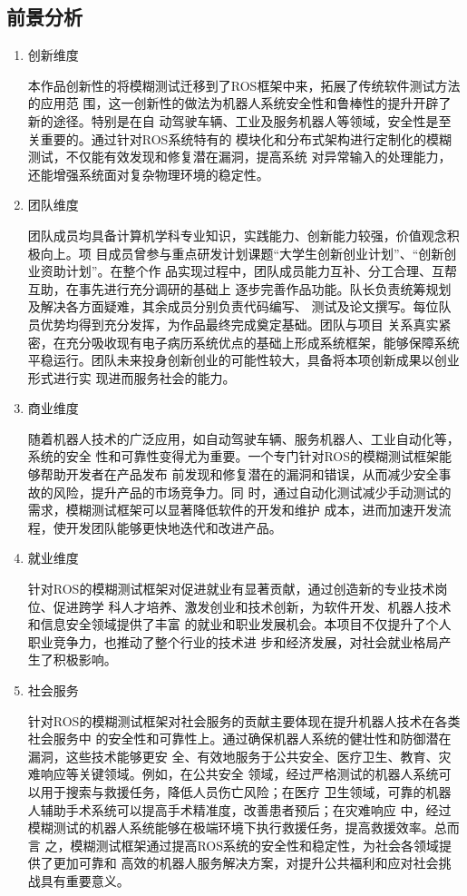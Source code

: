 \subsection{前景分析}
\begin{enumerate}
  \item 创新维度
  
  本作品创新性的将模糊测试迁移到了ROS框架中来，拓展了传统软件测试方法的应用范
  围，这一创新性的做法为机器人系统安全性和鲁棒性的提升开辟了新的途径。特别是在自
  动驾驶车辆、工业及服务机器人等领域，安全性是至关重要的。通过针对ROS系统特有的
  模块化和分布式架构进行定制化的模糊测试，不仅能有效发现和修复潜在漏洞，提高系统
  对异常输入的处理能力，还能增强系统面对复杂物理环境的稳定性。
  
  \item 团队维度
  
  团队成员均具备计算机学科专业知识，实践能力、创新能力较强，价值观念积极向上。项
  目成员曾参与重点研发计划课题“大学生创新创业计划”、“创新创业资助计划”。在整个作
  品实现过程中，团队成员能力互补、分工合理、互帮互助，在事先进行充分调研的基础上
  逐步完善作品功能。队长负责统筹规划及解决各方面疑难，其余成员分别负责代码编写、
  测试及论文撰写。每位队员优势均得到充分发挥，为作品最终完成奠定基础。团队与项目
  关系真实紧密，在充分吸收现有电子病历系统优点的基础上形成系统框架，能够保障系统
  平稳运行。团队未来投身创新创业的可能性较大，具备将本项创新成果以创业形式进行实
  现进而服务社会的能力。
  
  \item 商业维度
  
  随着机器人技术的广泛应用，如自动驾驶车辆、服务机器人、工业自动化等，系统的安全
  性和可靠性变得尤为重要。一个专门针对ROS的模糊测试框架能够帮助开发者在产品发布
  前发现和修复潜在的漏洞和错误，从而减少安全事故的风险，提升产品的市场竞争力。同
  时，通过自动化测试减少手动测试的需求，模糊测试框架可以显著降低软件的开发和维护
  成本，进而加速开发流程，使开发团队能够更快地迭代和改进产品。
  
  \item 就业维度
  
  针对ROS的模糊测试框架对促进就业有显著贡献，通过创造新的专业技术岗位、促进跨学
  科人才培养、激发创业和技术创新，为软件开发、机器人技术和信息安全领域提供了丰富
  的就业和职业发展机会。本项目不仅提升了个人职业竞争力，也推动了整个行业的技术进
  步和经济发展，对社会就业格局产生了积极影响。
  
  \item 社会服务
  
  针对ROS的模糊测试框架对社会服务的贡献主要体现在提升机器人技术在各类社会服务中
  的安全性和可靠性上。通过确保机器人系统的健壮性和防御潜在漏洞，这些技术能够更安
  全、有效地服务于公共安全、医疗卫生、教育、灾难响应等关键领域。例如，在公共安全
  领域，经过严格测试的机器人系统可以用于搜索与救援任务，降低人员伤亡风险；在医疗
  卫生领域，可靠的机器人辅助手术系统可以提高手术精准度，改善患者预后；在灾难响应
  中，经过模糊测试的机器人系统能够在极端环境下执行救援任务，提高救援效率。总而言
  之，模糊测试框架通过提高ROS系统的安全性和稳定性，为社会各领域提供了更加可靠和
  高效的机器人服务解决方案，对提升公共福利和应对社会挑战具有重要意义。
\end{enumerate}
